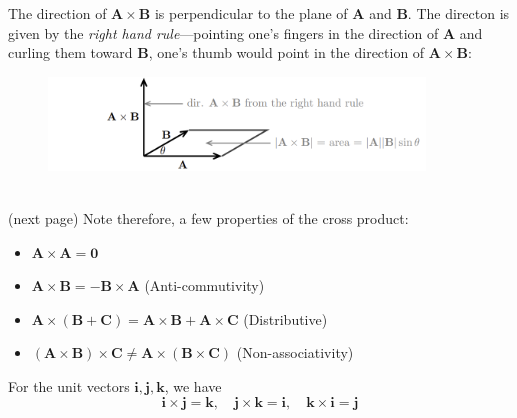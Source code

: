 \documentclass{report}
\begin{document}
The direction of $\mathbf{A\times B}$ is perpendicular to the plane of $\mathbf{A}$ and $\mathbf{B}$. 
The directon is given by the \textit{right hand rule}---pointing one's fingers in the direction of 
$\mathbf{A}$ and curling them toward $\mathbf{B}$, one's thumb would point in the direction of 
$\mathbf{A\times B}$:
\begin{figure}[h]
\includegraphics[width=10cm]{Capture76}\\
\centering
\end{figure}\\
(next page)
\newpage
\noindent Note therefore, a few properties of the cross product:
\begin{itemize}
\item $\mathbf{A\times A=0}$
\item $\mathbf{A\times B=-B\times A}$ (Anti-commutivity)
\item $\mathbf{A\times(B+C)=A\times B+A\times C}$
(Distributive)
\item $\mathbf{(A\times B)\times C\neq A\times(B\times C)}$ (Non-associativity)
\end{itemize}
For the unit vectors $\mathbf{i,j,k}$, we have
\begin{equation*}
\mathbf{i\times j=k,\quad j\times k=i,\quad k\times i=j}
\end{equation*}

\newpage
\end{document}
